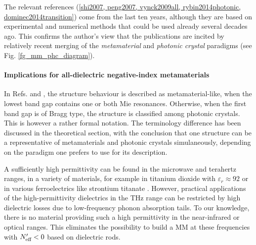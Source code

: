 The relevant references (\ref{shi2007, peng2007, vynck2009all, rybin2014photonic, dominec2014transition}) come from the last ten years, although they are based on experimental and numerical methods that could be used already several decades ago. This confirms the author's view that the publications are incited by relatively recent merging of the \textit{metamaterial} and \textit{photonic crystal} paradigms (see Fig. \ref{fg_mm_phc_diagram}).

\paragraph{Implications for all-dielectric negative-index metamaterials} %
In Refs.  \cite{rybin2014photonic} and \cite{dominec2014transition}, the structure behaviour is described as metamaterial-like, when the lowest band gap contains one or both Mie resonances. Otherwise, when the first band gap is of Bragg type, the structure is classified among photonic crystals. This is however a rather formal notation. The terminology difference has been discussed in the theoretical section, with the conclusion that one structure can be a representative of metamaterials and photonic crystals simulaneously, depending on the paradigm one prefers to use for its description. 
 

A sufficiently high permittivity can be found in the microwave and terahertz ranges, in a variety of materials, for example in titanium dioxide with $\varepsilon_r \approx 92$ \cite{nemec2009tunable} or in various ferroelectrics like strontium titanate \cite{skoromets2011tuning}. However, practical applications of the high-permittivity dielectrics in the THz range can be restricted by high dielectric losses due to low-frequency phonon absorption tails. To our knowledge, there is no material providing such a high permittivity in the near-infrared or optical ranges. This eliminates the possibility to build a MM at these frequencies with $N_{\text{eff} }'<0$ based on dielectric rods.

\FloatBarrier %

